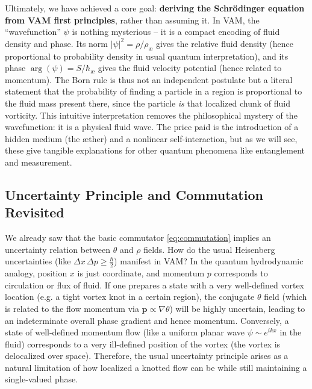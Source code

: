 \documentclass[a4paper,12pt]{article}
\begin{document}
    Ultimately, we have achieved a core goal: \textbf{deriving the Schrödinger equation from VAM first principles}, rather than assuming it. In VAM, the “wavefunction” $\psi$ is nothing mysterious -- it is a compact encoding of fluid density and phase. Its norm $|\psi|^2 = \rho/\rho_{\text{\ae}}$ gives the relative fluid density (hence proportional to probability density in usual quantum interpretation), and its phase $\arg(\psi) = S/\hbar_{\text{\ae}}$ gives the fluid velocity potential (hence related to momentum). The Born rule is thus not an independent postulate but a literal statement that the probability of finding a particle in a region is proportional to the fluid mass present there, since the particle \emph{is} that localized chunk of fluid vorticity. This intuitive interpretation removes the philosophical mystery of the wavefunction: it is a physical fluid wave. The price paid is the introduction of a hidden medium (the æther) and a nonlinear self-interaction, but as we will see, these give tangible explanations for other quantum phenomena like entanglement and measurement.

    \subsection{Uncertainty Principle and Commutation Revisited}
    We already saw that the basic commutator \eqref{eq:commutation} implies an uncertainty relation between $\theta$ and $\rho$ fields. How do the usual Heisenberg uncertainties (like $\Delta x\,\Delta p \ge \frac{\hbar}{2}$) manifest in VAM? In the quantum hydrodynamic analogy, position $x$ is just coordinate, and momentum $p$ corresponds to circulation or flux of fluid. If one prepares a state with a very well-defined vortex location (e.g. a tight vortex knot in a certain region), the conjugate $\theta$ field (which is related to the flow momentum via $\mathbf{p}\propto \nabla \theta$) will be highly uncertain, leading to an indeterminate overall phase gradient and hence momentum. Conversely, a state of well-defined momentum flow (like a uniform planar wave $\psi \sim e^{i k x}$ in the fluid) corresponds to a very ill-defined position of the vortex (the vortex is delocalized over space). Therefore, the usual uncertainty principle arises as a natural limitation of how localized a knotted flow can be while still maintaining a single-valued phase.
\end{document}
